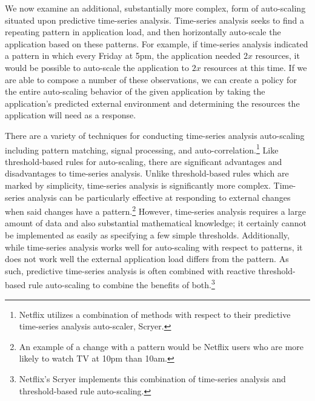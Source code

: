 We now examine an additional, substantially more complex, form of auto-scaling
situated upon predictive time-series analysis. Time-series analysis seeks to
find a repeating pattern in application load, and then horizontally auto-scale
the application based on these
patterns.\cite[pg. 29]{auto-scaling-techniques-for-elastic-applications-in-cloud-environments}
For example, if time-series analysis indicated a pattern in which
every Friday at 5pm, the application needed
$2x$ resources, it would be possible to auto-scale the application to $2x$
resources at this time. If we are able to compose a number of these
observations, we can create a policy for the entire auto-scaling behavior of
the given application by taking the application's predicted external environment
and determining the resources the application will need as a response.

There are a variety of techniques for conducting time-series analysis
auto-scaling including pattern matching, signal processing, and
auto-correlation.\footnote{Netflix utilizes a combination of methods with
respect to their predictive time-series analysis auto-scaler,
Scryer.\cite{netflix-scryer-part-ii}}\cite[pg.
32]{auto-scaling-techniques-for-elastic-applications-in-cloud-environments}
Like threshold-based rules for auto-scaling, there are significant
advantages and disadvantages to time-series analysis. Unlike threshold-based
rules which are marked by simplicity, time-series analysis is significantly more
complex. Time-series analysis can be particularly effective
at responding to external changes when said changes have a pattern.\footnote{An
example of a change with a pattern would be Netflix users who are more likely to
watch TV at 10pm than 10am.} However, time-series analysis requires a
large amount of data and also substantial mathematical
knowledge; it certainly cannot be implemented as easily as specifying a few
simple thresholds. Additionally, while time-series analysis works well for
auto-scaling with respect to patterns, it does not work well the external
application load differs from the pattern. As such, predictive time-series analysis is
often combined with reactive threshold-based rule auto-scaling to combine the benefits of
both.\footnote{Netflix's Scryer implements this combination of
time-series analysis and threshold-based rule
auto-scaling.\cite{netflix-scryer-part-ii}}

